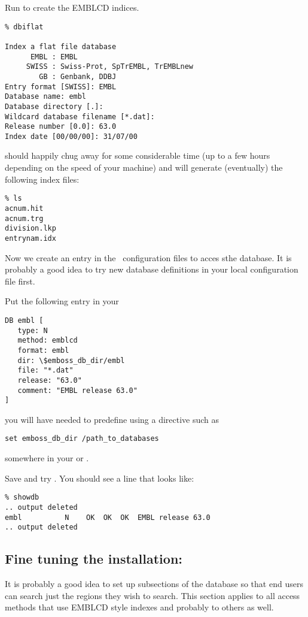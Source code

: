 \documentclass{report}
\begin{document}
Run  to create the EMBLCD indices.

\begin{verbatim}
% dbiflat

Index a flat file database
      EMBL : EMBL
     SWISS : Swiss-Prot, SpTrEMBL, TrEMBLnew
        GB : Genbank, DDBJ
Entry format [SWISS]: EMBL   
Database name: embl
Database directory [.]: 
Wildcard database filename [*.dat]: 
Release number [0.0]: 63.0
Index date [00/00/00]: 31/07/00
\end{verbatim}

 should happily chug away for some considerable time
(up to a few hours depending on the speed of your machine) and will
generate (eventually) the following index files:

\begin{verbatim}
% ls
acnum.hit
acnum.trg
division.lkp
entrynam.idx
\end{verbatim}

Now we create an entry in the \EMBOSS\ configuration files to acces
sthe database. It is probably a good idea to try new database
definitions in your local configuration file first.

Put the following entry in your 

\begin{verbatim}
DB embl [
   type: N
   method: emblcd
   format: embl
   dir: \$emboss_db_dir/embl
   file: "*.dat"
   release: "63.0"
   comment: "EMBL release 63.0"
]
\end{verbatim}

you will have needed to predefine  using a
directive such as

\begin{verbatim}
set emboss_db_dir /path_to_databases
\end{verbatim} 

somewhere in your  or .

Save  and try . You should see a
line that looks like:

\begin{verbatim}
% showdb
.. output deleted
embl          N    OK  OK  OK  EMBL release 63.0
.. output deleted
\end{verbatim}

\subsection{Fine tuning the installation:}
\label{sec:finetune}
It is probably a good idea to set up subsections of the database so
that end users can search just the regions they wish to search. This
section applies to all access methods that use EMBLCD style indexes
and probably to others as well.
\end{document}
